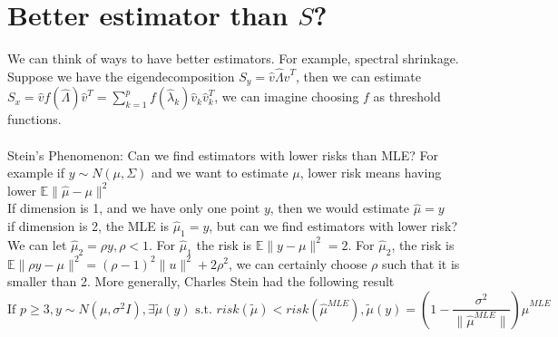 \documentclass[12pt]{article}
\theoremstyle{plain}
\begin{document}
\section*{Better estimator than $S$?}
We can think of ways to have better estimators. For example, spectral shrinkage. Suppose we have the eigendecomposition $S_y = \hat{v} \hat{\Lambda}\hat{v}^T$, then we can estimate $S_x =  \hat{v} f(\hat{\Lambda})\hat{v}^T = \sum_{k=1}^p f(\hat{\lambda}_k)\hat{v}_k \hat{v}_k^T $, we can imagine choosing $f$ as threshold  functions.\\
\\
Stein's Phenomenon: Can we find estimators with lower risks than MLE? For example if $y \sim N(\mu, \Sigma)$ and we want to estimate $\mu$, lower risk means having lower $\mathbb{E}\|\hat{\mu}-\mu\|^2$\\
If dimension is 1, and we have only one point $y$, then we would estimate $\hat{\mu}=y$\\
if dimension is 2, the MLE is $\hat{\mu}_1 = y$, but can we find estimators with lower risk? We can let $\hat{\mu}_2 = \rho y, \rho < 1$. For $\hat{\mu}_1$ the risk is $\mathbb{E}\|y-\mu\|^2=2$. For $\hat{\mu}_2 $, the risk is $\mathbb{E}\|\rho y-\mu\|^2= (\rho -1)^2 \|u\|^2 + 2\rho^2$, we can certainly choose $\rho$ such that it is smaller than 2. More generally, Charles Stein had the following result\\
$$\text{If  } p \geq 3, y \sim N(\mu, \sigma^2 I), \exists \tilde{\mu}(y) \text{  s.t.  } risk(\tilde{\mu}) < risk(\hat{\mu}^{MLE}), \tilde{\mu}(y) = (1-\frac{\sigma^2}{\|\hat{\mu}^{MLE}\|})\hat{\mu}^{MLE}$$
\end{document}
